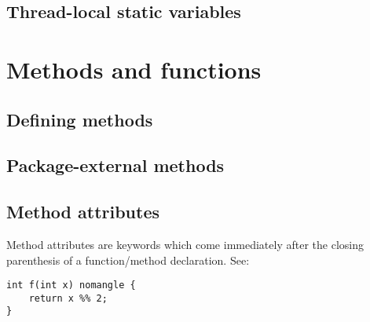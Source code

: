 \documentclass{article}
\begin{document}
\subsection{Thread-local static variables}
\label{sub:classes:threadlocal}

\section{Methods and functions}
\label{sec:methods}

\subsection{Defining methods}
\label{sub:methods:definition}

\subsection{Package-external methods}
\label{sub:methods:extern}

\subsection{Method attributes}
\label{sub:methods:attributes}
Method attributes are keywords which come immediately after the closing
parenthesis of a function/method declaration. See:
\begin{verbatim}
int f(int x) nomangle {
    return x %% 2;
}
\end{verbatim}
\end{document}
